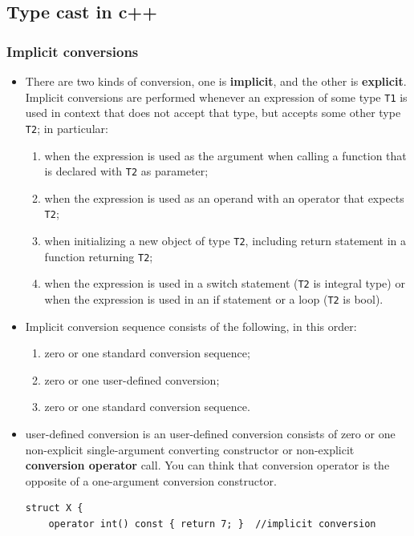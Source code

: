 \documentclass[a4paper,11pt,twoside]{book}
\begin{document}
\subsection{Type cast in c++}
\subsubsection{Implicit conversions}
\begin{itemize}
\item There are two kinds of conversion, one is \textbf{implicit}, and the other is \textbf{explicit}. Implicit conversions are performed whenever an expression of some type \texttt{T1} is used in context that does not accept that type, but accepts some other type \texttt{T2}; in particular:
	\begin{enumerate}
		\item when the expression is used as the argument when calling a function that is declared with \texttt{T2} as parameter;
		\item when the expression is used as an operand with an operator that expects \texttt{T2};
		\item when initializing a new object of type \texttt{T2}, including return statement in a function returning \texttt{T2};
		\item when the expression is used in a switch statement (\texttt{T2} is integral type) or when the expression is used in an if statement or a loop (\texttt{T2} is bool).
	\end{enumerate}
	
	\item Implicit conversion sequence consists of the following, in this order:
	\begin{enumerate}
		\item zero or one standard conversion sequence;
		\item zero or one user-defined conversion;
		\item zero or one standard conversion sequence.
	\end{enumerate}

	\item user-defined conversion is an user-defined conversion consists of zero or one non-explicit single-argument converting constructor or non-explicit \textbf{conversion operator} call. You can think that conversion operator is the opposite of a one-argument conversion constructor.
\begin{lstlisting}[numbers=none]	
struct X {
	operator int() const { return 7; } 	//implicit conversion
	

\end{lstlisting}
\end{itemize}
\end{document}
